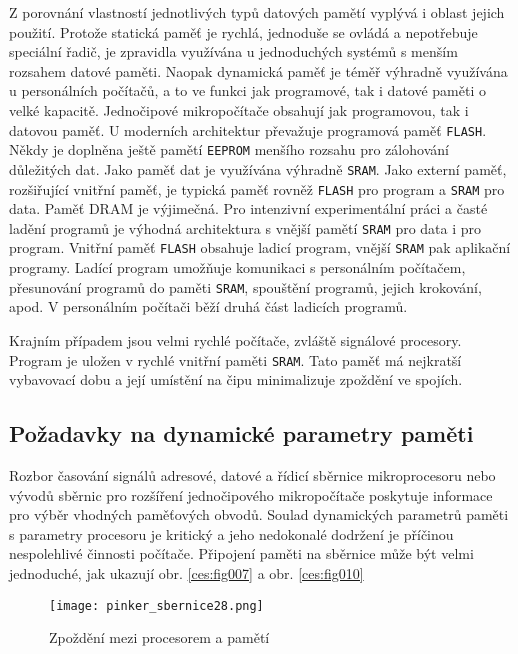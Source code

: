       Z porovnání vlastností jednotlivých typů datových pamětí vyplývá i oblast jejich použití. 
      Protože statická paměť je rychlá, jednoduše se ovládá a nepotřebuje speciální řadič, je 
      zpravidla využívána u jednoduchých systémů s menším rozsahem datové paměti. Naopak dynamická 
      paměť je téměř výhradně využívána u personálních počítačů, a to ve funkci jak programové, tak 
      i datové paměti o velké kapacitě. Jednočipové mikropočítače obsahují jak programovou, tak i 
      datovou paměť. U moderních architektur převažuje programová paměť \texttt{FLASH}. Někdy je 
      doplněna ještě pamětí \texttt{EEPROM} menšího rozsahu pro zálohování důležitých dat. Jako 
      paměť dat je využívána výhradně \texttt{SRAM}. Jako externí paměť, rozšiřující vnitřní paměť, 
      je typická paměť rovněž \texttt{FLASH} pro program a \texttt{SRAM} pro data. Paměť DRAM je 
      výjimečná. Pro intenzivní experimentální práci a časté ladění programů je výhodná 
      architektura s vnější pamětí \texttt{SRAM} pro data i pro program. Vnitřní paměť 
      \texttt{FLASH} obsahuje ladicí program, vnější \texttt{SRAM} pak aplikační programy. Ladící 
      program umožňuje komunikaci s personálním počítačem, přesunování programů do paměti 
      \texttt{SRAM}, spouštění programů, jejich krokování, apod. V personálním počítači běží druhá 
      část ladicích programů.
      
      Krajním případem jsou velmi rychlé počítače, zvláště signálové procesory. Program je uložen v 
      rychlé vnitřní paměti \texttt{SRAM}. Tato paměť má nejkratší vybavovací dobu a její umístění 
      na čipu minimalizuje zpoždění ve spojích.
      
    \subsection{Požadavky na dynamické parametry paměti}\label{MIT:chap_mem_req}
      Rozbor časování signálů adresové, datové a řídicí sběrnice mikroprocesoru nebo vývodů sběrnic 
      pro rozšíření jednočipového mikropočítače poskytuje informace pro výběr vhodných paměťových 
      obvodů. Soulad dynamických parametrů paměti s parametry procesoru je kritický a jeho 
      nedokonalé dodržení je příčinou nespolehlivé činnosti počítače. Připojení paměti na sběrnice 
      může být velmi jednoduché, jak ukazují obr. \ref{ces:fig007} a obr. 
      \ref{ces:fig010}
           
      \begin{figure}[ht!] %
        \centering
        \texttt{[image: pinker\_sbernice28.png]}
        \caption{Zpoždění mezi procesorem a pamětí}
        \label{MIT:fig_sbernice28}
      \end{figure}
      
